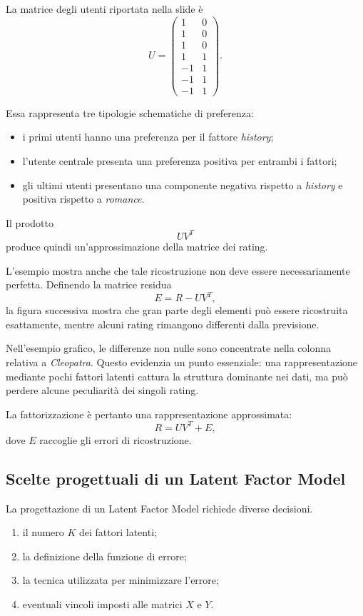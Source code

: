 La matrice degli utenti riportata nella slide è
\[
U=
\begin{pmatrix}
1  & 0\\
1  & 0\\
1  & 0\\
1  & 1\\
-1 & 1\\
-1 & 1\\
-1 & 1
\end{pmatrix}.
\]

Essa rappresenta tre tipologie schematiche di preferenza:
\begin{itemize}
    \item i primi utenti hanno una preferenza per il fattore \emph{history};
    \item l'utente centrale presenta una preferenza positiva per entrambi i fattori;
    \item gli ultimi utenti presentano una componente negativa rispetto a \emph{history} e positiva rispetto a \emph{romance}.
\end{itemize}

Il prodotto
\[
UV^{T}
\]
produce quindi un'approssimazione della matrice dei rating.

L'esempio mostra anche che tale ricostruzione non deve essere necessariamente perfetta. Definendo la matrice residua
\[
E = R-UV^{T},
\]
la figura successiva mostra che gran parte degli elementi può essere ricostruita esattamente, mentre alcuni rating rimangono differenti dalla previsione.

Nell'esempio grafico, le differenze non nulle sono concentrate nella colonna relativa a \emph{Cleopatra}. Questo evidenzia un punto essenziale: una rappresentazione mediante pochi fattori latenti cattura la struttura dominante nei dati, ma può perdere alcune peculiarità dei singoli rating.

La fattorizzazione è pertanto una rappresentazione approssimata:
\[
R = UV^{T}+E,
\]
dove $E$ raccoglie gli errori di ricostruzione.

\subsection{Scelte progettuali di un Latent Factor Model}

La progettazione di un Latent Factor Model richiede diverse decisioni.

\begin{enumerate}
    \item il numero $K$ dei fattori latenti;
    \item la definizione della funzione di errore;
    \item la tecnica utilizzata per minimizzare l'errore;
    \item eventuali vincoli imposti alle matrici $X$ e $Y$.
\end{enumerate}

